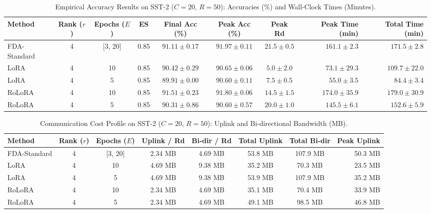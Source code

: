 \documentclass[10pt,a4paper]{article}
\begin{document}
\begin{table}[H]
\centering
\caption{Empirical Accuracy Results on SST-2 ($C=20$, $R=50$): Accuracies (\%) and Wall-Clock Times (Minutes).}
\scriptsize
\setlength{\tabcolsep}{3.5pt}
\begin{tabular*}{\textwidth}{@{\extracolsep{\fill}}lccccccrr@{}}
\toprule
\textbf{Method} & \textbf{Rank ($r$)} & \textbf{Epochs ($E$)} & \textbf{ES} & \textbf{Final Acc (\%)} & \textbf{Peak Acc (\%)} & \textbf{Peak Rd} & \textbf{Peak Time (min)} & \textbf{Total Time (min)} \\
\midrule
FDA-Standard & 4 & [3, 20] & 0.85 & $\mathbf{91.11 \pm 0.17}$ & $\mathbf{91.97 \pm 0.11}$ & $21.5 \pm 0.5$ & $161.1 \pm 2.3$ & $171.5 \pm 2.8$ \\
LoRA & 4 & 10 & 0.85 & $90.42 \pm 0.29$ & $90.65 \pm 0.06$ & $5.0 \pm 2.0$ & $73.1 \pm 29.3$ & $109.7 \pm 22.0$ \\
LoRA & 4 & 5 & 0.85 & $89.91 \pm 0.00$ & $90.60 \pm 0.11$ & $7.5 \pm 0.5$ & $\mathbf{55.0 \pm 3.5}$ & $84.4 \pm 3.4$ \\
RoLoRA & 4 & 10 & 0.85 & $\mathbf{91.51 \pm 0.23}$ & $91.80 \pm 0.06$ & $14.5 \pm 1.5$ & $174.0 \pm 35.9$ & $179.0 \pm 30.9$ \\
RoLoRA & 4 & 5 & 0.85 & $90.31 \pm 0.86$ & $90.60 \pm 0.57$ & $20.0 \pm 1.0$ & $145.5 \pm 6.1$ & $152.6 \pm 5.9$ \\
\bottomrule
\end{tabular*}
\end{table}

\begin{table}[H]
\centering
\caption{Communication Cost Profile on SST-2 ($C=20$, $R=50$): Uplink and Bi-directional Bandwidth (MB).}
\scriptsize
\setlength{\tabcolsep}{4.0pt}
\begin{tabular*}{\textwidth}{@{\extracolsep{\fill}}lccccccr@{}}
\toprule
\textbf{Method} & \textbf{Rank ($r$)} & \textbf{Epochs ($E$)} & \textbf{Uplink / Rd} & \textbf{Bi-dir / Rd} & \textbf{Total Uplink} & \textbf{Total Bi-dir} & \textbf{Peak Uplink} \\
\midrule
FDA-Standard & 4 & [3, 20] & 2.34 MB & 4.69 MB & 53.8 MB & 107.9 MB & 50.3 MB \\
LoRA & 4 & 10 & 4.69 MB & 9.38 MB & 35.2 MB & 70.3 MB & 23.5 MB \\
LoRA & 4 & 5 & 4.69 MB & 9.38 MB & 53.9 MB & 107.9 MB & 35.2 MB \\
RoLoRA & 4 & 10 & 2.34 MB & 4.69 MB & 35.1 MB & 70.4 MB & 33.9 MB \\
RoLoRA & 4 & 5 & 2.34 MB & 4.69 MB & 49.1 MB & 98.5 MB & 46.8 MB \\
\bottomrule
\end{tabular*}
\end{table}
\end{document}
